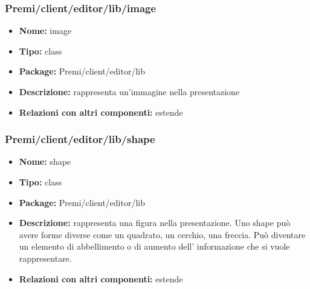 \subsubsection{Premi/client/editor/lib/image}
\begin{itemize}
  \item[] \textbf{Nome:} image
  \item[] \textbf{Tipo:} class
  \item[] \textbf{Package:} Premi/client/editor/lib
  \item[] \textbf{Descrizione:} rappresenta un'immagine nella presentazione
  \item[] \textbf{Relazioni con altri componenti:} estende 
\end{itemize}
\subsubsection{Premi/client/editor/lib/shape}
\begin{itemize}
  \item[] \textbf{Nome:} shape
  \item[] \textbf{Tipo:} class
  \item[] \textbf{Package:} Premi/client/editor/lib
  \item[] \textbf{Descrizione:} rappresenta una figura nella presentazione. Uno shape può avere forme diverse come un quadrato, un cerchio, una freccia. Può diventare un elemento di abbellimento o di aumento dell' informazione che si vuole rappresentare. 
  \item[] \textbf{Relazioni con altri componenti:} estende 
\end{itemize}
